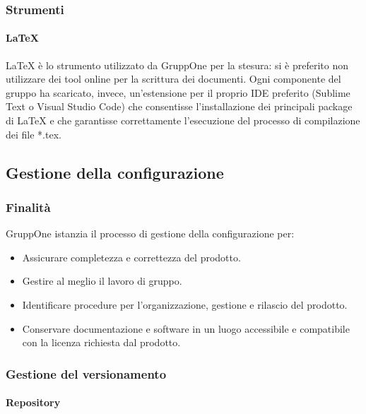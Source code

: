 \documentclass[../norme-di-progetto.tex]{subfiles}
\begin{document}
\subsubsection{Strumenti}

\paragraph{\LaTeX}%
\label{par:LaTeX}
\LaTeX{} è lo strumento utilizzato da GruppOne per la stesura: si è preferito non utilizzare dei tool online per la scrittura dei documenti.
Ogni componente del gruppo ha scaricato, invece, un'estensione per il proprio IDE preferito (Sublime Text o Visual Studio Code) che consentisse l'installazione dei principali package di \LaTeX{} e che garantisse correttamente l'esecuzione del processo di compilazione dei file *.tex.

\subsection{Gestione della configurazione}%
\label{sub:gestione_della_configurazione}

\subsubsection{Finalità}%
\label{subs:gestione_della_configurazione/finalita}

GruppOne istanzia il processo di gestione della configurazione per:
\begin{itemize}
  \item Assicurare completezza e correttezza del prodotto.
  \item Gestire al meglio il lavoro di gruppo.
  \item Identificare procedure per l'organizzazione, gestione e rilascio del prodotto.
  \item Conservare documentazione e software in un luogo accessibile e compatibile con la licenza richiesta dal prodotto.
\end{itemize}

\subsubsection{Gestione del versionamento}%
\label{subs:gestione_del_versionamento}

\paragraph{Repository}%
\label{par:repository}
\end{document}
